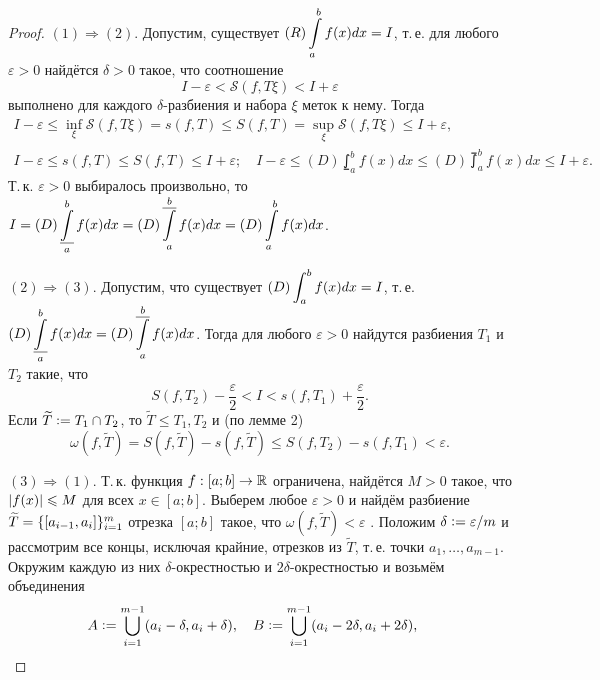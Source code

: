 \begin{proof}
    $(1) \Rightarrow (2)$. Допустим, существует $\displaystyle (R)\int\limits_a^bf(x)dx = I$, т.\,е. для любого $\varepsilon > 0$ найдётся $\delta > 0$ такое, что соотношение
    \[
        I - \varepsilon < \mathcal{S}(f, T\xi) < I + \varepsilon
    \]
    выполнено для каждого $\delta$-разбиения и набора $\xi$ меток к нему. Тогда
    \begin{gather*}
        I - \varepsilon \leqslant \inf\limits_\xi\mathcal{S}(f, T\xi) = s(f, T) \leqslant S(f, T) = \sup\limits_\xi\mathcal{S}(f, T\xi) \leqslant I + \varepsilon,\\
        I - \varepsilon \leqslant s(f, T) \leqslant S(f, T) \leqslant I + \varepsilon;\quad
        I - \varepsilon \leqslant (D)\lowint_a^bf(x)dx \leqslant (D)\upint_a^bf(x)dx \leqslant I + \varepsilon.
    \end{gather*}
    Т.\,к. $\varepsilon > 0$ выбиралось произвольно, то $\displaystyle I = (D)\operatorname*{\underline{\int}}_a^bf(x)dx = (D)\operatorname*{\overline{\int}}_a^bf(x)dx = (D)\int\limits_a^bf(x)dx$.

    $(2) \Rightarrow (3)$. Допустим, что существует $\displaystyle (D)\int_a^bf(x)dx = I$, т.\,е. $\displaystyle (D)\operatorname*{\underline{\int}}_a^bf(x)dx = (D)\operatorname*{\overline{\int}}_a^bf(x)dx$. Тогда для любого $\varepsilon > 0$ найдутся разбиения $T_1$ и $T_2$ такие, что
    \[
        S(f, T_2) - \frac{\varepsilon}{2} < I < s(f, T_1) + \frac{\varepsilon}{2}.
    \]
    Если $\widetilde{T} \vcentcolon = T_1 \cap T_2$, то $\widetilde{T} \leqslant T_1, T_2$ и (по лемме 2)
    \[
        \omega(f, \widetilde{T}) = S(f, \widetilde{T}) - s(f, \widetilde{T}) \leqslant S(f, T_2) - s(f, T_1) < \varepsilon.
    \]

    $(3) \Rightarrow (1)$. Т.\,к. функция $f: [a; b] \to \mathbb{R}$ ограничена, найдётся $M > 0$ такое, что $\left\lvert f(x)\right\rvert \leqslant M$ для всех $x \in [a; b]$. Выберем любое $\varepsilon > 0$ и найдём разбиение $\widetilde{T} = \{\left[a_{i - 1}, a_i\right]\}_{i = 1}^m$ отрезка $[a; b]$ такое, что $\omega(f, \widetilde{T}) < \varepsilon$ . Положим $\delta \vcentcolon = \varepsilon / m$ и рассмотрим все концы, исключая крайние, отрезков из $\widetilde{T}$, т.\,е. точки $a_1, \ldots, a_{m - 1}$. Окружим каждую из них $\delta$-окрестностью и $2\delta$-окрестностью и возьмём объединения
    \[
        A \vcentcolon = \bigcup_{i = 1}^{m - 1}(a_i - \delta, a_i + \delta),\quad
        B \vcentcolon = \bigcup_{i = 1}^{m - 1}(a_i - 2\delta, a_i + 2\delta),\quad
    \]


\end{proof}
